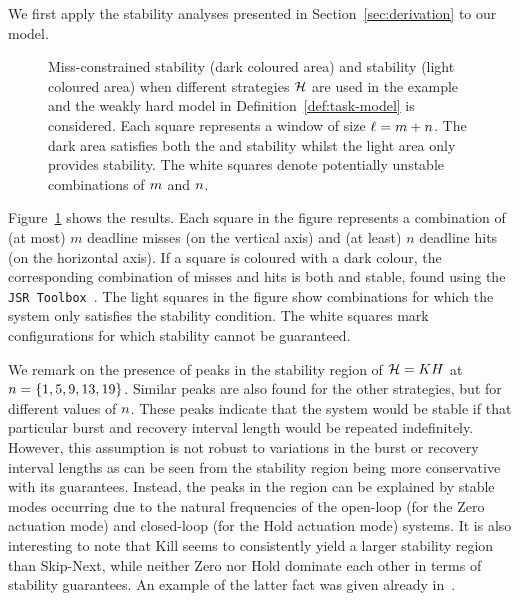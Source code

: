 We first apply the stability analyses presented in Section~\ref{sec:derivation} to our model.
\begin{figure}[t]
    \centerline{\resizebox{0.95\textwidth}{!}{}}
    \caption{Miss-constrained stability (dark coloured area) and \nilsstability{} stability (light coloured area) when different strategies $\mathcal{H}$ are used in the example and the weakly hard model in Definition~\ref{def:task-model} is considered.
        Each square represents a window of size $\ell = m+n$.
        The dark area satisfies both the \switchingstability{} and \nilsstability{} stability whilst the light area only provides \nilsstability{} stability.
        The white squares denote potentially unstable combinations of $m$ and $n$.}
    \label{fig:stability_extended}
\end{figure}
Figure~\ref{fig:stability_extended} shows the results. Each square in the figure represents a combination of (at most) $m$ deadline misses (on the vertical axis) and (at least) $n$ deadline hits (on the horizontal axis).
If a square is coloured with a dark colour, the corresponding combination of misses and hits is both \nilsstability{} and \switchingstability{} stable, found using the \texttt{JSR Toolbox}~\cite{Jungers:2014}. 
The light squares in the figure show combinations for which the system only satisfies the \nilsstability{} stability condition. 
The white squares mark configurations for which stability cannot be guaranteed.

We remark on the presence of peaks in the \nilsstability{} stability region of $\mathcal{H} = KH$ at $n = \{1, 5, 9, 13, 19\}$.
Similar peaks are also found for the other strategies, but for different values of $n$.
These peaks indicate that the system would be stable if that particular burst and recovery interval length would be repeated indefinitely.
However, this assumption is not robust to variations in the burst or recovery interval lengths as can be seen from the \switchingstability{} stability region being more conservative with its guarantees.
Instead, the peaks in the \nilsstability{} region can be explained by stable modes occurring due to the natural frequencies of the open-loop (for the Zero actuation mode) and closed-loop (for the Hold actuation mode) systems.
It is also interesting to note that Kill seems to consistently yield a larger stability region than Skip-Next, while neither Zero nor Hold dominate each other in terms of stability guarantees. An example of the latter fact was given already in~\cite{schenato09}.

